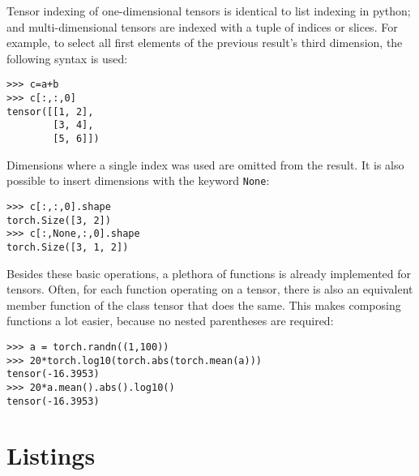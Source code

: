 Tensor indexing of one-dimensional tensors is identical to list indexing in python;
and multi-dimensional tensors are indexed with a tuple of indices or slices.
For example, to select all first elements of the previous result's third dimension, the following syntax is used:
\begin{lstlisting}
>>> c=a+b
>>> c[:,:,0]
tensor([[1, 2],
        [3, 4],
        [5, 6]])
\end{lstlisting}
Dimensions where a single index was used are omitted from the result.
It is also possible to insert dimensions with the keyword \verb|None|:
\begin{lstlisting}
>>> c[:,:,0].shape
torch.Size([3, 2])
>>> c[:,None,:,0].shape
torch.Size([3, 1, 2])
\end{lstlisting}

Besides these basic operations, a plethora of functions is already implemented for tensors.
Often, for each function operating on a tensor,
there is also an equivalent member function of the class tensor that does the same.
This makes composing functions a lot easier, because no nested parentheses are required:
\begin{lstlisting}
>>> a = torch.randn((1,100))
>>> 20*torch.log10(torch.abs(torch.mean(a)))
tensor(-16.3953)
>>> 20*a.mean().abs().log10()
tensor(-16.3953)
\end{lstlisting}

\newpage
\section{Listings}







